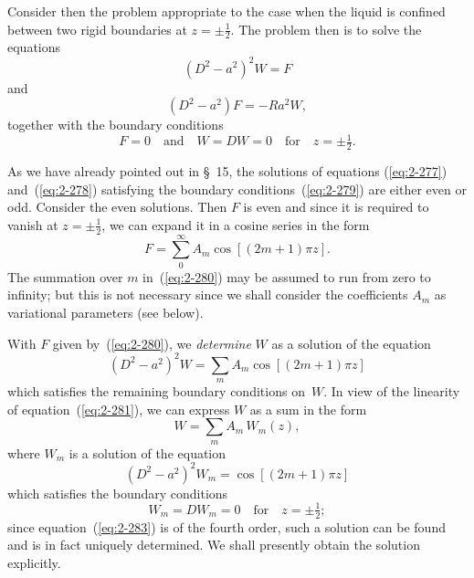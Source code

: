 Consider then the problem appropriate to the case when the liquid is
confined between two rigid boundaries at $z = \pm\tfrac{1}{2}$. The problem then is
to solve the equations
\begin{equation}
\label{eq:2-277}
(D^2 - a^2)^2 W = F
\end{equation}
and
\begin{equation}
\label{eq:2-278}
(D^2 - a^2) F = -Ra^2 W,
\end{equation}
together with the boundary conditions
\begin{equation}
\label{eq:2-279}
F = 0 \quad\text{and}\quad W = DW = 0 \quad\text{for}\quad z = \pm\tfrac{1}{2}.
\end{equation}

As we have already pointed out in \S~15, the solutions of equations
(\ref{eq:2-277}) and~(\ref{eq:2-278}) satisfying the boundary conditions~(\ref{eq:2-279}) are either even or
odd. Consider the even solutions. Then $F$ is even and since it is required
to vanish at $z = \pm\tfrac{1}{2}$, we can expand it in a cosine series in the form
\begin{equation}
\label{eq:2-280}
F = \sum_0^\infty A_m \cos[(2m+1)\pi z].
\end{equation}
The summation over $m$ in~(\ref{eq:2-280}) may be assumed to run from zero to
infinity; but this is not necessary since we shall consider the coefficients
$A_m$ as variational parameters (see below).

With $F$ given by~(\ref{eq:2-280}), we \emph{determine} $W$ as a solution of the equation
\begin{equation}
\label{eq:2-281}
(D^2 - a^2)^2 W = \sum_m A_m \cos[(2m+1)\pi z]
\end{equation}
which satisfies the remaining boundary conditions on~$W$. In view of the
linearity of equation~(\ref{eq:2-281}), we can express $W$ as a sum in the form
\begin{equation}
\label{eq:2-282}
W = \sum_m A_m\,W_m(z),
\end{equation}
where $W_m$ is a solution of the equation
\begin{equation}
\label{eq:2-283}
(D^2 - a^2)^2 W_m = \cos[(2m+1)\pi z]
\end{equation}
which satisfies the boundary conditions
\begin{equation}
\label{eq:2-284}
W_m = DW_m = 0 \quad\text{for}\quad z = \pm\tfrac{1}{2};
\end{equation}
since equation~(\ref{eq:2-283}) is of the fourth order, such a solution can be found
and is in fact uniquely determined. We shall presently obtain the
solution explicitly.

